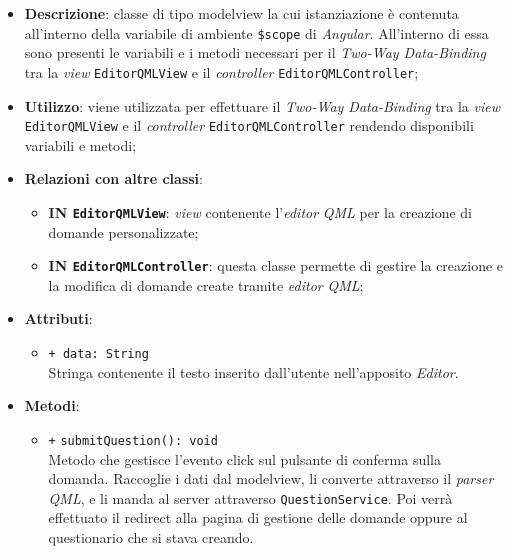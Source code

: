 \begin{itemize}
	\item \textbf{Descrizione}: classe di tipo modelview la cui istanziazione è contenuta all'interno della variabile di ambiente \texttt{\$scope} di \textit{Angular}. All'interno di essa sono presenti le variabili e i metodi necessari per il \textit{Two-Way Data-Binding} tra la \textit{view} \texttt{EditorQMLView} e il \textit{controller} \texttt{EditorQMLController}; 
	\item \textbf{Utilizzo}: viene utilizzata per effettuare il \textit{Two-Way Data-Binding} tra la \textit{view}\\ \texttt{EditorQMLView} e il \textit{controller} \texttt{EditorQMLController} rendendo disponibili variabili e metodi;
	\item \textbf{Relazioni con altre classi}:
	\begin{itemize}
		\item \textbf{IN \texttt{EditorQMLView}}: \textit{view} contenente l'\textit{editor} \textit{QML} per la creazione di domande personalizzate; 
		\item \textbf{IN \texttt{EditorQMLController}}: questa classe permette di gestire la creazione e la modifica di domande create tramite \textit{editor} \textit{QML};
	\end{itemize}
	\item \textbf{Attributi}:
	\begin{itemize}
		\item \texttt{+ data: String} \\ Stringa contenente il testo inserito dall'utente nell'apposito \textit{Editor}.
	\end{itemize}
	\item \textbf{Metodi}:
	\begin{itemize}
		\item \texttt{+} \texttt{submitQuestion(): void}\\ 
		Metodo che gestisce l’evento click sul pulsante di conferma sulla domanda. Raccoglie i dati dal modelview, li converte attraverso il \textit{parser} \textit{QML}, e li manda al server attraverso \texttt{QuestionService}. Poi verrà effettuato il redirect alla pagina di gestione delle domande oppure al questionario che si stava creando.
	\end{itemize}
\end{itemize}
